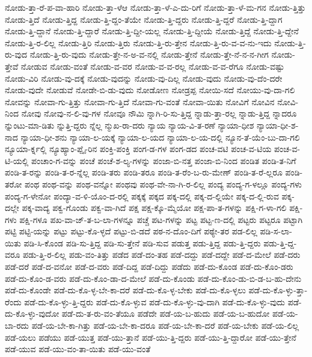 {ನೋಡು-ತ್ತಾ-ರೆ-ಪ-ವಾ-ಹಾರಿ
ನೋಡು-ತ್ತಾ-ಳೆಆ
ನೋಡು-ತ್ತಾ-ಳೆ-ಎ-ದು-ರಿಗೆ
ನೋಡು-ತ್ತಾ-ಳೆ-ಮ-ಗನ
ನೋಡು-ತ್ತಿತ್ತು
ನೋಡು-ತ್ತಿದೆ
ನೋಡು-ತ್ತಿದ್ದ
ನೋಡು-ತ್ತಿ-ದ್ದಂ-ತೆಯೇ
ನೋಡು-ತ್ತಿ-ದ್ದರು
ನೋಡು-ತ್ತಿ-ದ್ದರೆ
ನೋಡು-ತ್ತಿ-ದ್ದಾಗ
ನೋಡು-ತ್ತಿ-ದ್ದಾನೆ
ನೋಡು-ತ್ತಿ-ದ್ದಾರೆ
ನೋಡು-ತ್ತಿ-ದ್ದೀ-ಯಲ್ಲ
ನೋಡು-ತ್ತಿ-ದ್ದೀಯೆ
ನೋಡು-ತ್ತಿದ್ದೆ
ನೋಡು-ತ್ತಿ-ದ್ದೇನೆ
ನೋಡು-ತ್ತಿ-ರ-ಲಿಲ್ಲ
ನೋಡು-ತ್ತಿರಿ
ನೋಡು-ತ್ತಿರು
ನೋಡು-ತ್ತಿ-ರು-ತ್ತೇನ
ನೋಡು-ತ್ತಿ-ರು-ವ-ವ-ನು-ಇದು
ನೋಡು-ತ್ತಿ-ರು-ವುದ
ನೋಡು-ತ್ತಿ-ರು-ವುದು
ನೋಡು-ತ್ತೇ-ನ-ಅ-ವ-ನಲ್ಲಿ
ನೋಡು-ತ್ತೇನೆ
ನೋಡು-ತ್ತೇ-ನೆ-ನ-ನ-ಗೀಗ
ನೋಡು-ತ್ತೇವೆ
ನೋಡುವ
ನೋಡು-ವಂತೆ
ನೋಡು-ವ-ವರ
ನೋಡು-ವ-ವ-ರಲ್ಲ
ನೋಡು-ವ-ವ-ರೆಗೂ
ನೋಡು-ವಷ್ಟು
ನೋಡು-ವಿರಿ
ನೋಡು-ವು-ದಕ್ಕೆ
ನೋಡು-ವುದನ್ನು
ನೋಡು-ವು-ದಿಲ್ಲ
ನೋಡು-ವುದು
ನೋಡು-ವು-ದೆಂ-ದರೇ
ನೋಡು-ವುದೇ
ನೋಡುವೆ
ನೋಡೇ-ಬಿ-ಡು-ವುದು
ನೋಡೋಣ
ನೋಡ್ರಪ್ಪ
ನೋಯಿ-ಸದೆ
ನೋಯು-ವು-ದಾ-ಗಲಿ
ನೋವನ್ನು
ನೋವಾ-ಗು-ತ್ತಿತ್ತು
ನೋವಾ-ಗು-ತ್ತಿದೆ
ನೋವಾ-ಗು-ವಂತೆ
ನೋವಾ-ಯಿತು
ನೋವಿಗೆ
ನೋವಿನ
ನೋವಿ-ನಿಂದ
ನೋವು
ನೋವು-ನ-ಲಿ-ವು-ಗಳ
ನೋವೂ
ನೌಮಿ
ನ್ನಾಗಿ-ರಿ-ಸು-ತ್ತಿದ್ದ
ನ್ನಾಡು-ತ್ತಾ-ರಲ್ಲ
ನ್ನಾಡು-ತ್ತಿದ್ದ
ನ್ನಾದರೂ
ನ್ನುಂಟು-ಮಾ-ಡಿತು
ನ್ನುತ್ತಿ-ದ್ದರು
ನ್ನೆಲ್ಲ
ನ್ಮುಖ-ರಾ-ದರು
ನ್ಯಾಯ
ನ್ಯಾಯ-ವಿ-ತ-ರಣೆ
ನ್ಯಾಯಾ-ಧೀಶ
ನ್ಯಾಯಾ-ಧೀ-ಶ-ನಾದ
ನ್ಯಾಯಾ-ಧೀ-ಶನು
ನ್ಯಾಯಾ-ಲ-ಯಕ್ಕೆ
ನ್ಯಾಯಾ-ಲ-ಯದ
ನ್ಯಾಯಾ-ಲ-ಯ-ದಲ್ಲಿ
ನ್ಯೂನ-ತೆ-ಯೆಂ-ಬು-ದಾ-ಗಲಿ
ನ್ಯೂಯಾ-ರ್ಕ್ನಲ್ಲಿ
ನ್ಯೂಹ್ಯಾಂ-ಪ್ಷೈ-ರಿನ
ಪಂಕ್ತಿ-ಪಂಕ್ತಿ
ಪಂಗ-ಡ-ಗಳ
ಪಂಗ-ಡದ
ಪಂಚ-ವಟಿ
ಪಂಚ-ವ-ಟಿಯ
ಪಂಚ-ವ-ಟಿ-ಯಲ್ಲಿ
ಪಂಚಾಂ-ಗ-ವನ್ನು
ಪಂಚೆ
ಪಂಚೆ-ಶ-ಲ್ಯ-ಗಳನ್ನು
ಪಂಜಾ-ಬಿ-ನತ್ತ
ಪಂಜಾ-ಬಿ-ನಿಂದ
ಪಂಡಿತ
ಪಂಡಿ-ತ-ನಿಗೆ
ಪಂಡಿ-ತ-ರನ್ನು
ಪಂಡಿ-ತ-ರ-ನ್ನೆಲ್ಲ
ಪಂಡಿ-ತರು
ಪಂಡಿ-ತರೂ
ಪಂಡಿ-ತ-ರೆಂ-ಬ-ರು-ಮೇಣ್
ಪಂಡಿ-ತ-ರೆ-ಲ್ಲರೂ
ಪಂಡಿ-ತರೋ
ಪಂಥ
ಪಂಥ-ವನ್ನು
ಪಂಥ-ವನ್ನೋ
ಪಂಥವು
ಪಂಥ-ವೇ-ನಾ-ಗಿ-ರ-ಲಿಲ್ಲ
ಪಂದ್ಯ
ಪಂದ್ಯ-ಗ-ಳಲ್ಲೂ
ಪಂದ್ಯ-ಗಳು
ಪಂದ್ಯ-ಗ-ಳೇನೋ
ಪಂದ್ಯಾ-ವ-ಳಿ-ಯೊಂ-ದ-ರಲ್ಲಿ
ಪಕ್ಕಕ್ಕೆ
ಪಕ್ಕದ
ಪಕ್ಕ-ದಲ್ಲಿ
ಪಕ್ಕ-ದ-ಲ್ಲಿಯೇ
ಪಕ್ಕ-ದ-ಲ್ಲಿ-ರುವ
ಪಕ್ಕ-ದಲ್ಲೇ
ಪಕ್ಕ-ವಾದ್ಯ
ಪಕ್ವ-ಗೊಂಡು
ಪಕ್ವ-ವಾ-ಗಿದೆ
ಪಕ್ಷ
ಪಕ್ಷ-ಕ್ಕೊ-ಮ್ಮೆಯೋ
ಪಕ್ಷ-ಪಾ-ತ-ಗಳನ್ನು
ಪಕ್ಷಿ-ಗ-ಳಾ-ಗಲಿ
ಪಕ್ಷಿ-ಗಳು
ಪಕ್ಷಿ-ಗಳೂ
ಪಖ-ವಾ-ಜ್-ತ-ಬ-ಲಾ-ಗಳನ್ನೂ
ಪಚ್ಚೆ
ಪಟ-ಗಳನ್ನು
ಪಟ್ಟ
ಪಟ್ಟ-ಣ-ದಲ್ಲಿ
ಪಟ್ಟರು
ಪಟ್ಟರೂ
ಪಟ್ಟಾಗಿ
ಪಟ್ಟಿ
ಪಟ್ಟಿ-ಯನ್ನು
ಪಟ್ಟು
ಪಟ್ಟು-ಕೊ-ಳ್ಳದೆ
ಪಟ್ಟು-ಬಿ-ಡದೆ
ಪಠ-ನ-ದೊಂ-ದಿಗೆ
ಪಠ್ಯೇ-ತರ
ಪಡ-ಲಿಲ್ಲ
ಪಡಿ-ಸ-ಲಾ-ಯಿತು
ಪಡಿ-ಸಿ-ಕೊಂಡ
ಪಡಿ-ಸು-ತ್ತಿದ್ದ
ಪಡಿ-ಸು-ತ್ತೇನೆ
ಪಡಿ-ಸುವ
ಪಡುತ್ತ
ಪಡು-ತ್ತಿದ್ದ
ಪಡು-ತ್ತಿ-ದ್ದರು
ಪಡು-ತ್ತಿ-ದ್ದ-ವರೂ
ಪಡು-ತ್ತಿ-ರ-ಲಿಲ್ಲ
ಪಡು-ವಂ-ತಿತ್ತು
ಪಡೆದ
ಪಡೆ-ದಂ-ತಹ
ಪಡೆ-ದದ್ದು
ಪಡೆ-ದದ್ದೇ
ಪಡೆ-ದ-ಮೇಲೆ
ಪಡೆ-ದರು
ಪಡೆ-ದರೆ
ಪಡೆ-ದ-ವನೋ
ಪಡೆ-ದ-ವರು
ಪಡೆ-ದಿದ್ದ
ಪಡೆ-ದಿದ್ದು
ಪಡೆದು
ಪಡೆ-ದು-ಕೊಂಡ
ಪಡೆ-ದು-ಕೊಂ-ಡರು
ಪಡೆ-ದು-ಕೊಂ-ಡ-ವರು
ಪಡೆ-ದು-ಕೊಂ-ಡಾ-ದ-ಮೇಲೆ
ಪಡೆ-ದು-ಕೊಂಡು
ಪಡೆ-ದು-ಕೊಂ-ಡು-ಬಿ-ಡ-ಬ-ಹು-ದೇನು
ಪಡೆ-ದು-ಕೊಂಡೇ
ಪಡೆ-ದು-ಕೊ-ಳ್ಳ-ಬೇ-ಕಾ-ದರೆ
ಪಡೆ-ದು-ಕೊ-ಳ್ಳ-ಬೇಕು
ಪಡೆ-ದು-ಕೊ-ಳ್ಳಲು
ಪಡೆ-ದು-ಕೊ-ಳ್ಳು-ತ್ತಾ-ರೆಂದು
ಪಡೆ-ದು-ಕೊ-ಳ್ಳು-ತ್ತಿ-ದ್ದರು
ಪಡೆ-ದು-ಕೊ-ಳ್ಳುವ
ಪಡೆ-ದು-ಕೊ-ಳ್ಳು-ವು-ದಾಗಿ
ಪಡೆ-ದು-ಕೊ-ಳ್ಳು-ವುದು
ಪಡೆ-ದು-ಕೊ-ಳ್ಳು-ವುದೋ
ಪಡೆ-ದು-ತ-ರು-ವಂ-ತೆಯೂ
ಪಡೆದೇ
ಪಡೆ-ಯ-ಬ-ಹುದು
ಪಡೆ-ಯ-ಬ-ಹುದೋ
ಪಡೆ-ಯ-ಬಾ-ರದು
ಪಡೆ-ಯ-ಬೇ-ಕಾ-ಗಿತ್ತು
ಪಡೆ-ಯ-ಬೇ-ಕಾ-ದರೂ
ಪಡೆ-ಯ-ಬೇ-ಕಾ-ದರೆ
ಪಡೆ-ಯ-ಬೇಕು
ಪಡೆ-ಯ-ಲಿಲ್ಲ
ಪಡೆ-ಯಲು
ಪಡೆಯು
ಪಡೆ-ಯುತ್ತ
ಪಡೆ-ಯು-ತ್ತಾನೆ
ಪಡೆ-ಯು-ತ್ತಿ-ದ್ದರು
ಪಡೆ-ಯು-ತ್ತಿ-ದ್ದಾರೋ
ಪಡೆ-ಯು-ತ್ತೇನೆ
ಪಡೆ-ಯುವ
ಪಡೆ-ಯು-ವಂ-ತಾ-ಯಿತು
ಪಡೆ-ಯು-ವಂತೆ
}
